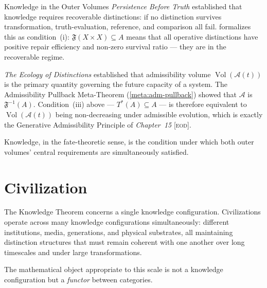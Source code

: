 \documentclass[12pt,twoside,openright]{book}
\newcommand{\adm}{\mathcal{A}}            %
\newcommand{\Vol}{\operatorname{Vol}}     %
\newcommand{\fateMap}{\mathfrak{F}}
\newcommand{\EOD}[1]{\textit{#1} [\textsc{eod}]}
\newcommand{\admRegion}{A}
\providecommand{\admRegion}{A}
\begin{document}
\begin{trilogylink}{Knowledge in the Outer Volumes}
\textit{Persistence Before Truth} established that knowledge
requires recoverable distinctions: if no distinction survives
transformation, truth-evaluation, reference, and comparison all
fail.  formalizes this as condition~(i):
$\fateMap(X\times X)\subseteq\admRegion$ means that all
operative distinctions have positive repair efficiency and
non-zero survival ratio --- they are in the recoverable regime.

\textit{The Ecology of Distinctions} established that
admissibility volume $\Vol(\adm(t))$ is the primary quantity
governing the future capacity of a system. The Admissibility
Pullback Meta-Theorem (\cref{meta:adm-pullback}) showed that
$\adm$ is $\fateMap^{-1}(\admRegion)$. Condition~(iii) above
--- $T^*(\admRegion)\subseteq\admRegion$ --- is therefore
equivalent to $\Vol(\adm(t))$ being non-decreasing under
admissible evolution, which is exactly the Generative
Admissibility Principle of \EOD{Chapter~15}.

Knowledge, in the fate-theoretic sense, is the condition under
which both outer volumes' central requirements are
simultaneously satisfied.
\end{trilogylink}

\section{Civilization}

The Knowledge Theorem concerns a single knowledge
configuration. Civilizations operate across many knowledge
configurations simultaneously: different institutions, media,
generations, and physical substrates, all maintaining
distinction structures that must remain coherent with one
another over long timescales and under large transformations.

The mathematical object appropriate to this scale is not a
knowledge configuration but a \emph{functor} between categories.
\end{document}
